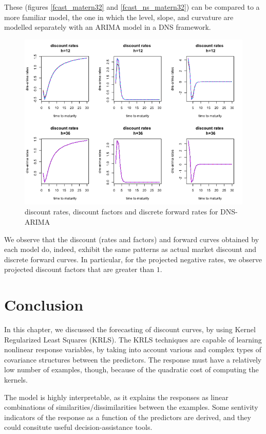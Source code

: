 These (figures \ref{fcast_matern32} and \ref{fcast_ns_matern32}) can be compared to a more familiar model, the one in which the level, slope, and curvature are modelled separately with an ARIMA model in a DNS framework. 

\begin{figure}[!htb]
\centering
\includegraphics[width=12.5cm]{gfx/chapter-krls-models/fcast_ns_arima}
\caption{discount rates, discount factors and discrete forward rates for DNS-ARIMA}
\label{fcast_ns_arima}
\end{figure}

We observe that the discount (rates and factors) and forward curves obtained by each model do, indeed, exhibit the same patterns as actual market discount and discrete forward curves. In particular, for the projected negative rates, we observe projected discount factors that are greater than $1$. 


\section{Conclusion}

In this chapter, we discussed the forecasting of discount curves, by using Kernel Regularized Least Squares (KRLS). The KRLS techniques are capable of learning nonlinear response variables, by taking into account various and complex types of covariance structures between the predictors. The response must have a relatively low number of examples, though, because of the quadratic cost of computing the kernels. 

The model is highly interpretable, as it explains the responses as linear combinations of similarities/dissimilarities between the examples. Some sentivity indicators of the response as a function of the predictors are derived, and they could consitute useful decision-assistance tools. 

